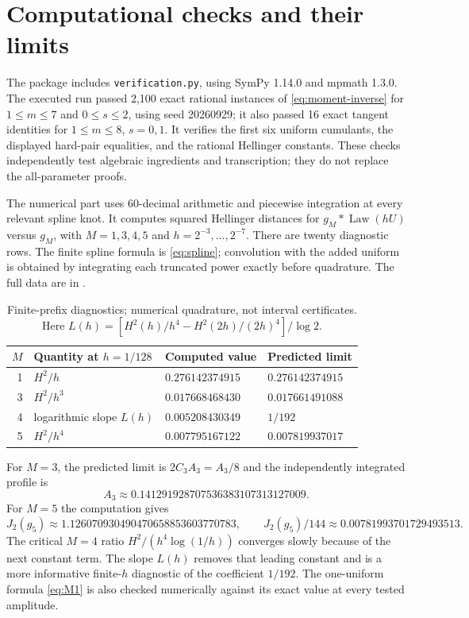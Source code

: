 \documentclass[11pt,a4paper]{article}
\numberwithin{equation}{section}
\theoremstyle{definition}
\theoremstyle{remark}
\DeclareMathOperator{\Law}{Law}
\begin{document}
\section{Computational checks and their limits}
\label{sec:verification}

The package includes \texttt{verification.py}, using SymPy 1.14.0 and
mpmath 1.3.0. The executed run passed 2,100 exact rational instances of
\eqref{eq:moment-inverse} for $1\le m\le7$ and $0\le s\le2$, using
seed 20260929; it also passed 16 exact tangent identities for
$1\le m\le8$, $s=0,1$. It verifies the first six uniform cumulants,
the displayed hard-pair equalities, and the rational Hellinger constants.
These checks independently test algebraic ingredients and transcription;
they do not replace the all-parameter proofs.

The numerical part uses 60-decimal arithmetic and piecewise integration at
every relevant spline knot. It computes squared Hellinger distances for
$g_M*\Law(hU)$ versus $g_M$, with $M=1,3,4,5$ and
$h=2^{-3},\ldots,2^{-7}$. There are twenty diagnostic rows. The finite
spline formula is \eqref{eq:spline}; convolution with the added uniform is
obtained by integrating each truncated power exactly before quadrature.
The full data are in .

\begin{table}[htbp]
\centering
\small
\begin{tabular}{@{}rlll@{}}
\toprule
$M$ & Quantity at $h=1/128$ & Computed value & Predicted limit\\
\midrule
1 & $H^2/h$ & $0.276142374915$ & $0.276142374915$\\
3 & $H^2/h^3$ & $0.017668468430$ & $0.017661491088$\\
4 & logarithmic slope $L(h)$ & $0.005208430349$ & $1/192$\\
5 & $H^2/h^4$ & $0.007795167122$ & $0.007819937017$\\
\bottomrule
\end{tabular}
\caption{Finite-prefix diagnostics; numerical quadrature, not interval
certificates. Here $L(h)=[H^2(h)/h^4-H^2(2h)/(2h)^4]/\log2$.}
\label{tab:diagnostics}
\end{table}

For $M=3$, the predicted limit is $2C_3A_3=A_3/8$ and the independently
integrated profile is
\[
 A_3\approx0.141291928707536383107313127009.
\]
For $M=5$ the computation gives
\[
 J_2(g_5)\approx1.126070930490470658853603770783,
 \qquad J_2(g_5)/144\approx0.00781993701729493513.
\]
The critical $M=4$ ratio $H^2/(h^4\log(1/h))$ converges slowly because
of the next constant term. The slope $L(h)$ removes that leading constant
and is a more informative finite-$h$ diagnostic of the coefficient $1/192$.
The one-uniform formula \eqref{eq:M1} is also checked numerically against
its exact value at every tested amplitude.
\end{document}
